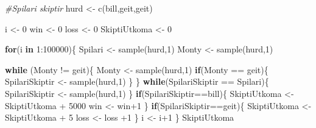 \documentclass[
]{article}
\newenvironment{Shaded}{\begin{snugshade}}{\end{snugshade}}
\newcommand{\CommentTok}[1]{\textcolor[rgb]{0.56,0.35,0.01}{\textit{#1}}}
\newcommand{\ControlFlowTok}[1]{\textcolor[rgb]{0.13,0.29,0.53}{\textbf{#1}}}
\newcommand{\DecValTok}[1]{\textcolor[rgb]{0.00,0.00,0.81}{#1}}
\newcommand{\FunctionTok}[1]{\textcolor[rgb]{0.00,0.00,0.00}{#1}}
\newcommand{\NormalTok}[1]{#1}
\newcommand{\OtherTok}[1]{\textcolor[rgb]{0.56,0.35,0.01}{#1}}
\newcommand{\SpecialCharTok}[1]{\textcolor[rgb]{0.00,0.00,0.00}{#1}}
\newcommand{\StringTok}[1]{\textcolor[rgb]{0.31,0.60,0.02}{#1}}
\begin{document}
\begin{Shaded}
\begin{Highlighting}[]
\CommentTok{\#Spilari skiptir}
\NormalTok{hurd }\OtherTok{\textless{}{-}} \FunctionTok{c}\NormalTok{(}\StringTok{\textquotesingle{}bill\textquotesingle{}}\NormalTok{,}\StringTok{\textquotesingle{}geit\textquotesingle{}}\NormalTok{,}\StringTok{\textquotesingle{}geit\textquotesingle{}}\NormalTok{)}

\NormalTok{i }\OtherTok{\textless{}{-}} \DecValTok{0}
\NormalTok{win }\OtherTok{\textless{}{-}} \DecValTok{0}
\NormalTok{loss }\OtherTok{\textless{}{-}} \DecValTok{0}
\NormalTok{SkiptiUtkoma }\OtherTok{\textless{}{-}} \DecValTok{0}

\ControlFlowTok{for}\NormalTok{(i }\ControlFlowTok{in} \DecValTok{1}\SpecialCharTok{:}\DecValTok{100000}\NormalTok{)\{}
\NormalTok{  Spilari }\OtherTok{\textless{}{-}} \FunctionTok{sample}\NormalTok{(hurd,}\DecValTok{1}\NormalTok{)}
\NormalTok{  Monty }\OtherTok{\textless{}{-}} \FunctionTok{sample}\NormalTok{(hurd,}\DecValTok{1}\NormalTok{)}
  
  \ControlFlowTok{while}\NormalTok{ (Monty }\SpecialCharTok{!=} \StringTok{\textquotesingle{}geit\textquotesingle{}}\NormalTok{)\{}
\NormalTok{    Monty }\OtherTok{\textless{}{-}} \FunctionTok{sample}\NormalTok{(hurd,}\DecValTok{1}\NormalTok{)}
    \ControlFlowTok{if}\NormalTok{(Monty }\SpecialCharTok{==} \StringTok{\textquotesingle{}geit\textquotesingle{}}\NormalTok{)\{}
\NormalTok{      SpilariSkiptir }\OtherTok{\textless{}{-}} \FunctionTok{sample}\NormalTok{(hurd,}\DecValTok{1}\NormalTok{)}
\NormalTok{    \}}
\NormalTok{  \}}
  \ControlFlowTok{while}\NormalTok{(SpilariSkiptir }\SpecialCharTok{==}\NormalTok{ Spilari)\{}
\NormalTok{    SpilariSkiptir }\OtherTok{\textless{}{-}} \FunctionTok{sample}\NormalTok{(hurd,}\DecValTok{1}\NormalTok{)}
\NormalTok{  \}}
  \ControlFlowTok{if}\NormalTok{(SpilariSkiptir}\SpecialCharTok{==}\StringTok{\textquotesingle{}bill\textquotesingle{}}\NormalTok{)\{}
\NormalTok{    SkiptiUtkoma }\OtherTok{\textless{}{-}}\NormalTok{ SkiptiUtkoma }\SpecialCharTok{+} \DecValTok{5000}
\NormalTok{    win }\OtherTok{\textless{}{-}}\NormalTok{ win}\SpecialCharTok{+}\DecValTok{1}
\NormalTok{  \}}
  \ControlFlowTok{if}\NormalTok{(SpilariSkiptir}\SpecialCharTok{==}\StringTok{\textquotesingle{}geit\textquotesingle{}}\NormalTok{)\{}
\NormalTok{    SkiptiUtkoma }\OtherTok{\textless{}{-}}\NormalTok{ SkiptiUtkoma }\SpecialCharTok{+} \DecValTok{5}
\NormalTok{    loss }\OtherTok{\textless{}{-}}\NormalTok{ loss }\SpecialCharTok{+}\DecValTok{1}
\NormalTok{  \}}
\NormalTok{  i }\OtherTok{\textless{}{-}}\NormalTok{ i}\SpecialCharTok{+}\DecValTok{1}
\NormalTok{\}}
\NormalTok{SkiptiUtkoma}
\end{Highlighting}
\end{Shaded}
\end{document}
